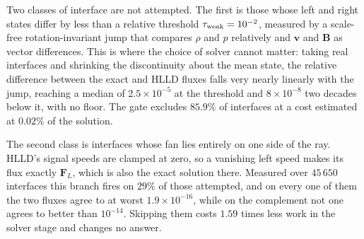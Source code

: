 Two classes of interface are not attempted. The first is those whose left and
right states differ by less than a relative threshold $\tau_{\rm weak} =
10^{-2}$, measured by a scale-free rotation-invariant jump that compares
$\rho$ and $p$ relatively and $\mathbf{v}$ and $\mathbf{B}$ as vector
differences. This is where the choice of solver cannot matter: taking real
interfaces and shrinking the discontinuity about the mean state, the relative
difference between the exact and HLLD fluxes falls very nearly linearly with
the jump, reaching a median of $2.5 \times 10^{-5}$ at the threshold and
$8 \times 10^{-8}$ two decades below it, with no floor. The gate excludes
$85.9\%$ of interfaces at a cost estimated at $0.02\%$ of the solution.

The second class is interfaces whose fan lies entirely on one side of the
ray. HLLD's signal speeds are clamped at zero, so a vanishing left speed
makes its flux exactly $\mathbf{F}_L$, which is also the exact solution
there. Measured over $45\,650$ interfaces this branch fires on $29\%$ of
those attempted, and on every one of them the two fluxes agree to at worst
$1.9 \times 10^{-16}$, while on the complement not one agrees to better than
$10^{-14}$. Skipping them costs $1.59$ times less work in the solver stage
and changes no answer.
